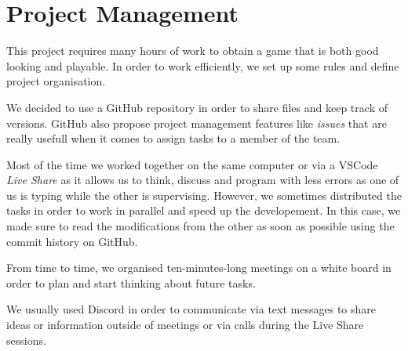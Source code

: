 \section{Project Management}
This project requires many hours of work to obtain a game that is both good looking and playable. In order to work efficiently, we set up some rules and define project organisation.

We decided to use a GitHub repository in order to share files and keep track of versions. GitHub also propose project management features like \textit{issues} that are really usefull when it comes to assign tasks to a member of the team.

Most of the time we worked together on the same computer or via a VSCode \textit{Live Share} as it allows us to think, discuss and program with less errors as one of us is typing while the other is supervising. However, we sometimes distributed the tasks in order to work in parallel and speed up the developement. In this case, we made sure to read the modifications from the other as soon as possible using the commit history on GitHub.

From time to time, we organised ten-minutes-long meetings on a white board in order to plan and start thinking about future tasks.

We usually used Discord in order to communicate via text messages to share ideas or information outside of meetings or via calls during the Live Share sessions.